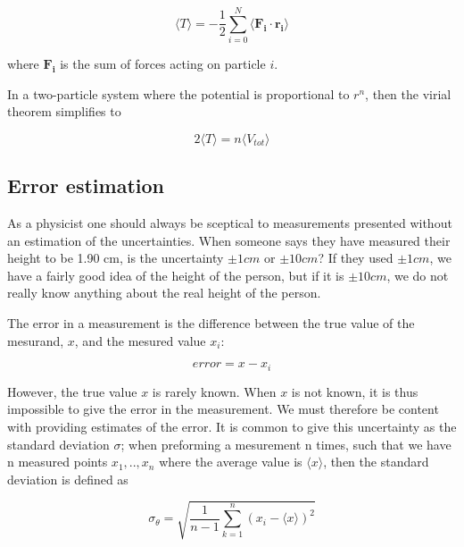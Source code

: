 \documentclass[norsk,a4paper,12pt]{article}
\begin{document}
\begin{equation}
\langle T \rangle = - \frac{1}{2} \sum_{i=0}^N \langle \boldsymbol{F_i} \cdot \boldsymbol{r_i} \rangle 
\end{equation}

where $\boldsymbol{F_i}$ is the sum of forces acting on particle $i$.\par 
\vspace{3mm}

In a two-particle system where the potential is proportional to $r^n$, then the virial theorem simplifies to 

\begin{equation}
2 \langle T \rangle = n \langle V_{tot} \rangle
\end{equation}

\subsection{Error estimation} \label{sec:error_estimation}
As a physicist one should always be sceptical to measurements presented without an estimation of the uncertainties. When someone says they have measured their height to be 1.90 cm, is the uncertainty $\pm 1 cm$ or $\pm 10 cm$? If they used $\pm 1 cm$, we have a fairly good idea of the height of the person, but if it is $\pm 10 cm$, we do not really know anything about the real height of the person. 
\par 
\vspace{3mm}
The error in a measurement is the difference between the true value of the mesurand, $x$, and the mesured value $x_i$:

\begin{equation}
	error = x - x_i
\end{equation}

However, the true value $x$ is rarely known. When $x$ is not known, it is thus impossible to give the error in the measurement. We must therefore be content with providing estimates of the error. It is common to give this uncertainty as the standard deviation $\sigma$; when preforming a mesurement n times, such that we have n measured points $x_1, .., x_n$ where the average value is $ \langle x \rangle $, then the standard deviation is defined as

\begin{equation}
\label{eq:standard_dev}
\sigma_{\theta} =  \sqrt{\frac{1}{n-1} \sum_{k=1}^n (x_i - \langle x \rangle)^2}
\end{equation}
\end{document}
